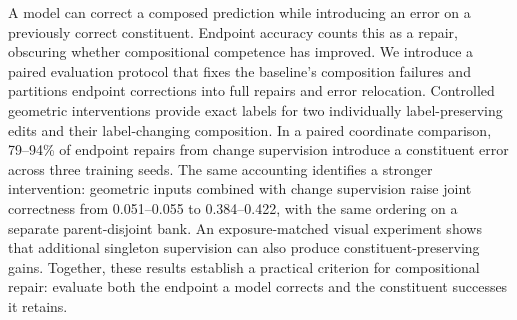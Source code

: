 A model can correct a composed prediction while introducing an error on a previously correct constituent. Endpoint accuracy counts this as a repair, obscuring whether compositional competence has improved. We introduce a paired evaluation protocol that fixes the baseline's composition failures and partitions endpoint corrections into full repairs and error relocation. Controlled geometric interventions provide exact labels for two individually label-preserving edits and their label-changing composition. In a paired coordinate comparison, 79--94\% of endpoint repairs from change supervision introduce a constituent error across three training seeds. The same accounting identifies a stronger intervention: geometric inputs combined with change supervision raise joint correctness from 0.051--0.055 to 0.384--0.422, with the same ordering on a separate parent-disjoint bank. An exposure-matched visual experiment shows that additional singleton supervision can also produce constituent-preserving gains. Together, these results establish a practical criterion for compositional repair: evaluate both the endpoint a model corrects and the constituent successes it retains.
